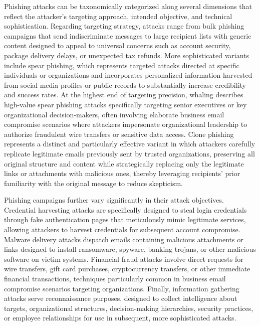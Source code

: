 Phishing attacks can be taxonomically categorized along several dimensions that reflect the attacker's targeting approach, intended objective, and technical sophistication. Regarding targeting strategy, attacks range from bulk phishing campaigns that send indiscriminate messages to large recipient lists with generic content designed to appeal to universal concerns such as account security, package delivery delays, or unexpected tax refunds. More sophisticated variants include spear phishing, which represents targeted attacks directed at specific individuals or organizations and incorporates personalized information harvested from social media profiles or public records to substantially increase credibility and success rates. At the highest end of targeting precision, whaling describes high-value spear phishing attacks specifically targeting senior executives or key organizational decision-makers, often involving elaborate business email compromise scenarios where attackers impersonate organizational leadership to authorize fraudulent wire transfers or sensitive data access. Clone phishing represents a distinct and particularly effective variant in which attackers carefully replicate legitimate emails previously sent by trusted organizations, preserving all original structure and content while strategically replacing only the legitimate links or attachments with malicious ones, thereby leveraging recipients' prior familiarity with the original message to reduce skepticism.

Phishing campaigns further vary significantly in their attack objectives. Credential harvesting attacks are specifically designed to steal login credentials through fake authentication pages that meticulously mimic legitimate services, allowing attackers to harvest credentials for subsequent account compromise. Malware delivery attacks dispatch emails containing malicious attachments or links designed to install ransomware, spyware, banking trojans, or other malicious software on victim systems. Financial fraud attacks involve direct requests for wire transfers, gift card purchases, cryptocurrency transfers, or other immediate financial transactions, techniques particularly common in business email compromise scenarios targeting organizations. Finally, information gathering attacks serve reconnaissance purposes, designed to collect intelligence about targets, organizational structures, decision-making hierarchies, security practices, or employee relationships for use in subsequent, more sophisticated attacks.

